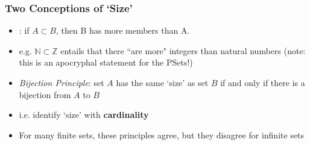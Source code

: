\begin{frame}
\frametitle{Two Conceptions of `Size'}

\begin{itemize}[<+->]

\item {}: if $A \subset B$, then B has more members than A. 

\item[] e.g. $\mathbb{N} \subset \mathbb{Z}$ entails that there ``are more" integers than natural numbers (note: this is an apocryphal statement for the PSets!) 

\item \emph{Bijection Principle}: set $A$ has the same `size' as set $B$ if and only if there is a bijection from $A$ to $B$ 

\item[] i.e. identify `size' with \textbf{cardinality} 

\item For many finite sets, these principles agree, but they disagree for infinite sets


\end{itemize}
\end{frame}



